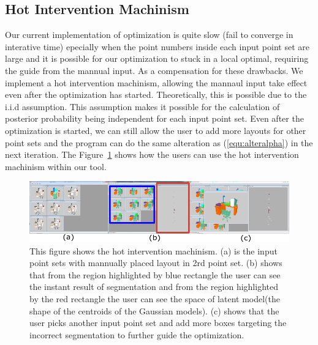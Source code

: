 \subsection{Hot Intervention Machinism}
Our current implementation of optimization is quite slow (fail to converge in interative time) epecially when the point numbers inside each input point set are large and it is possible for our optimization to stuck in a local optimal, requiring the guide from the mannual input. As a compensation for these drawbacks. We implement a hot intervention machinism, allowing the mannaul input take effect even after the optimization has started. Theoretically, this is possible due to the i.i.d assumption. 
This assumption makes it possible for the calculation of posterior probability being independent for each input point set. Even after the optimization is started, we can still allow the user to add more layouts for other point sets and the program can do the same alteration as (\ref{equ:alteralpha}) in the next iteration. The Figure~\ref{fig:hi} shows how the users can use the hot intervention machinism within our tool.
\begin{figure}[htb]
	\centering
	\includegraphics[width=\linewidth]{images/hotintervention/hi}
	\caption{\label{fig:hi}This figure shows the hot intervention machinism. (a) is the input point sets with mannually placed layout in 2rd point set. (b) shows that from the region highlighted by blue rectangle the user can see the instant result of segmentation and from the region highlighted by the red rectangle the user can see the space of latent model(the shape of the centroids of the Gaussian models). (c) shows that the user picks another input point set and add more boxes targeting the incorrect segmentation to further guide the optimization.}
\end{figure}
 